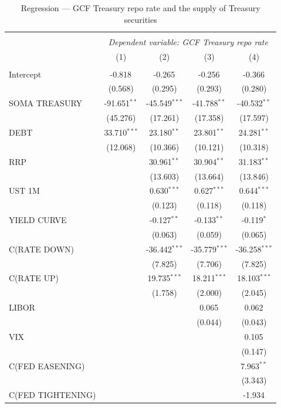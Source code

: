 \documentclass[11pt,a4paper,english,oneside]{article}
\begin{document}
\begin{table}[!htbp] \centering
\caption{Regression --- GCF Treasury repo rate and the supply of Treasury securities}
\begin{tabular}{@{\extracolsep{5pt}}lcccc}
\\[-1.8ex]\hline
\hline \\[-1.8ex]
& \multicolumn{4}{c}{\textit{Dependent variable: GCF Treasury repo rate}} \
\cr \cline{4-5}
\\[-1.8ex] & (1) & (2) & (3) & (4) \\
\hline \\[-1.8ex]
 Intercept & -0.818$^{}$ & -0.265$^{}$ & -0.256$^{}$ & -0.366$^{}$ \\
  & (0.568) & (0.295) & (0.293) & (0.280) \\
 SOMA TREASURY & -91.651$^{**}$ & -45.549$^{***}$ & -41.788$^{**}$ & -40.532$^{**}$ \\
  & (45.276) & (17.261) & (17.358) & (17.597) \\
 DEBT & 33.710$^{***}$ & 23.180$^{**}$ & 23.801$^{**}$ & 24.281$^{**}$ \\
  & (12.068) & (10.366) & (10.121) & (10.318) \\
 RRP & & 30.961$^{**}$ & 30.904$^{**}$ & 31.183$^{**}$ \\
  & & (13.603) & (13.664) & (13.846) \\
 UST 1M & & 0.630$^{***}$ & 0.627$^{***}$ & 0.644$^{***}$ \\
  & & (0.123) & (0.118) & (0.118) \\
 YIELD CURVE & & -0.127$^{**}$ & -0.133$^{**}$ & -0.119$^{*}$ \\
  & & (0.063) & (0.059) & (0.065) \\
 C(RATE DOWN) & & -36.442$^{***}$ & -35.779$^{***}$ & -36.258$^{***}$ \\
  & & (7.825) & (7.706) & (7.825) \\
 C(RATE UP) & & 19.735$^{***}$ & 18.211$^{***}$ & 18.103$^{***}$ \\
  & & (1.758) & (2.000) & (2.045) \\
 LIBOR & & & 0.065$^{}$ & 0.062$^{}$ \\
  & & & (0.044) & (0.043) \\
 VIX & & & & 0.105$^{}$ \\
  & & & & (0.147) \\
 C(FED EASENING) & & & & 7.963$^{**}$ \\
  & & & & (3.343) \\
 C(FED TIGHTENING) & & & & -1.934$^{}$ \\

\end{tabular}
\end{table}
\end{document}

